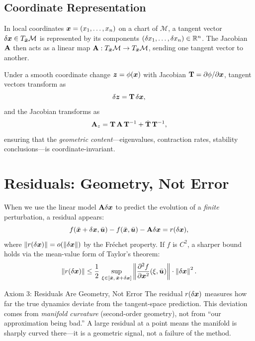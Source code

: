\subsection{Coordinate Representation}

In local coordinates $\bm{x} = (x_1,\dots,x_n)$ on a chart of $\mathcal{M}$, a tangent
vector $\delta\bm{x} \in T_{\bar{\bm{x}}}\mathcal{M}$ is represented by its components
$(\delta x_1, \dots, \delta x_n) \in \mathbb{R}^n$. The Jacobian $\mathbf{A}$ then acts as a
linear map $\mathbf{A}: T_{\bar{\bm{x}}}\mathcal{M} \to T_{\bar{\bm{x}}}\mathcal{M}$, sending one
tangent vector to another.

Under a smooth coordinate change $\bm{z} = \phi(\bm{x})$ with Jacobian
$\mathbf{T} = \partial\phi/\partial\bm{x}$, tangent vectors transform as
\begin{equation}
\delta\bm{z} = \mathbf{T}\,\delta\bm{x},
\label{eq:ch1:tangent-transform}
\end{equation}
and the Jacobian transforms as
\begin{equation}
\mathbf{A}_z = \mathbf{T}\,\mathbf{A}\,\mathbf{T}^{-1} + \dot{\mathbf{T}}\,\mathbf{T}^{-1},
\label{eq:ch1:jacobian-transform}
\end{equation}
ensuring that the \emph{geometric content}---eigenvalues, contraction rates, stability
conclusions---is coordinate-invariant.


\section{Residuals: Geometry, Not Error}

When we use the linear model $\mathbf{A}\delta\bm{x}$ to predict the evolution of a \emph{finite}
perturbation, a residual appears:
\begin{equation}
f(\bar{\bm{x}} + \delta\bm{x}, \bar{\bm{u}}) - f(\bar{\bm{x}}, \bar{\bm{u}}) - \mathbf{A}\delta\bm{x}
= r(\delta\bm{x}),
\label{eq:ch1:residual-def}
\end{equation}
where $\left\lVert r(\delta\bm{x}) \right\rVert = o(\left\lVert \delta\bm{x} \right\rVert)$ by the Fréchet property. If $f$ is $C^2$, a
sharper bound holds via the mean-value form of Taylor's theorem:
\begin{equation}
\left\lVert r(\delta\bm{x}) \right\rVert \leq \frac{1}{2}\,\sup_{\xi \in [\bar{\bm{x}},\,\bar{\bm{x}}+\delta\bm{x}]}
\left\lVert \frac{\partial^2 f}{\partial \bm{x}^2}(\xi,\bar{\bm{u}})\right\rVert
\cdot \left\lVert \delta\bm{x} \right\rVert^2.
\label{eq:ch1:residual-bound}
\end{equation}

\begin{axiombox}{Axiom 3: Residuals Are Geometry, Not Error}
The residual $r(\delta\bm{x})$ measures how far the true dynamics deviate from the tangent-space
prediction. This deviation comes from \emph{manifold curvature} (second-order geometry),
not from ``our approximation being bad.'' A large residual at a point means the manifold
is sharply curved there---it is a geometric signal, not a failure of the method.
\end{axiombox}

